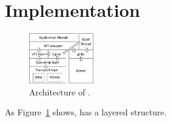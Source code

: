 \section{Implementation}
\label{socksdirect:sec:implementation}

\begin{figure}[htbp]
	\centering
	\includegraphics[width=0.25\textwidth]{images/libsd_architecture}
	
	\caption{Architecture of \libipc{}.}
	\label{socksdirect:fig:libsd-architecture}
\end{figure}



As Figure~\ref{socksdirect:fig:libsd-architecture} shows, \libipc{} has a layered structure.








